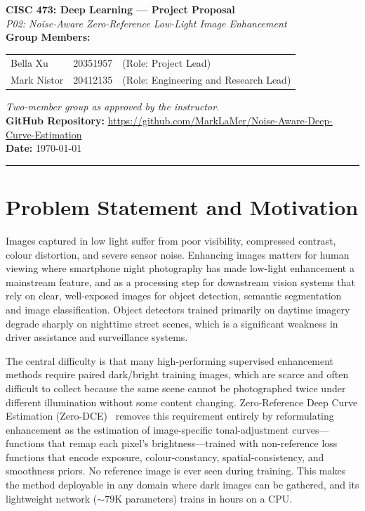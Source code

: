 \documentclass[11pt, letterpaper]{article}
\begin{document}
{\centering
  {\Large\textbf{CISC 473: Deep Learning --- Project Proposal}}\\[0.5em]
  {\large\textit{P02: Noise-Aware Zero-Reference Low-Light Image Enhancement}}\\[0.4em]
  \textbf{Group Members:}\\

\begin{tabular}{lcl}
{Bella Xu} &  20351957 & (Role: Project Lead)  \\
{Mark Nistor}& 20412135 & (Role: Engineering and Research Lead)  \\
\end{tabular}

  {\small\textit{Two-member group as approved by the instructor.}}\\[0.3em]
  \textbf{GitHub Repository:} \url{https://github.com/MarkLaMer/Noise-Aware-Deep-Curve-Estimation}\\[0.3em]
  \textbf{Date:} \today\\[0.4em]
  \rule{\linewidth}{0.4pt}
}

\section{Problem Statement and Motivation}

Images captured in low light suffer from poor visibility, compressed contrast, colour distortion, and severe sensor noise. Enhancing images matters for human viewing where smartphone night photography has made low-light enhancement a mainstream feature, and as a processing step for downstream vision systems that rely on clear, well-exposed images for object detection, semantic segmentation and image classification. Object detectors trained primarily on daytime imagery degrade sharply on nighttime street scenes, which is a significant weakness in driver assistance and surveillance systems.

The central difficulty is that many high-performing supervised enhancement methods require paired dark/bright training images, which are scarce and often difficult to collect because the same scene cannot be photographed twice under different illumination without some content changing. Zero-Reference Deep Curve Estimation (Zero-DCE)~\cite{guo2020zero} removes this requirement entirely by reformulating enhancement as the estimation of image-specific tonal-adjustment curves---functions that remap each pixel's brightness---trained with non-reference loss functions that encode exposure, colour-constancy, spatial-consistency, and smoothness priors. No reference image is ever seen during training. This makes the method deployable in any domain where dark images can be gathered, and its lightweight network ($\sim 79$K parameters) trains in hours on a CPU.
\end{document}
